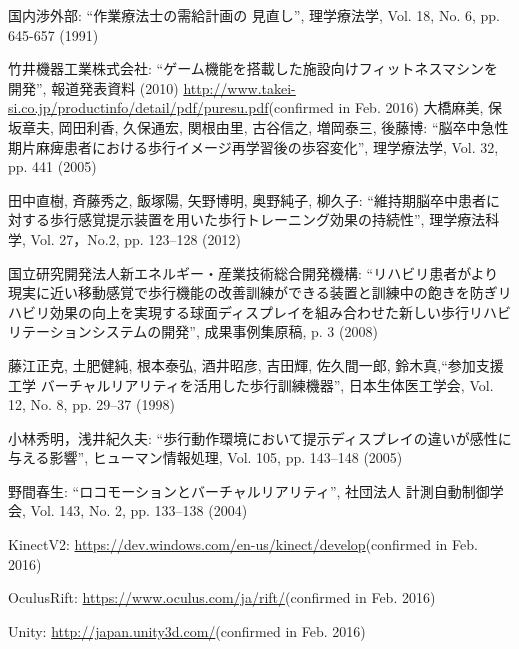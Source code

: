 \thispagestyle{myheadings}
\markright{}
\def\bibname{参考文献}
\begin{thebibliography}{20}


国内渉外部: ``作業療法士の需給計画の 見直し'', 理学療法学, Vol. 18, No. 6, pp. 645-657 (1991)

竹井機器工業株式会社: ``ゲーム機能を搭載した施設向けフィットネスマシンを開発'', 報道発表資料 (2010)
\url{http://www.takei-si.co.jp/productinfo/detail/pdf/puresu.pdf}(confirmed in Feb. 2016)
大橋麻美, 保坂章夫, 岡田利香, 久保通宏, 関根由里, 古谷信之, 増岡泰三, 後藤博: ``脳卒中急性期片麻痺患者における歩行イメージ再学習後の歩容変化'', 理学療法学, Vol. 32,  pp. 441 (2005)

田中直樹, 斉藤秀之, 飯塚陽, 矢野博明, 奥野純子, 柳久子: ``維持期脳卒中患者に対する歩行感覚提示装置を用いた歩行トレーニング効果の持続性'', 理学療法科学, Vol. 27，No.2, pp. 123--128 (2012)

国立研究開発法人新エネルギー・産業技術総合開発機構: ``リハビリ患者がより現実に近い移動感覚で歩行機能の改善訓練ができる装置と訓練中の飽きを防ぎリハビリ効果の向上を実現する球面ディスプレイを組み合わせた新しい歩行リハビリテーションシステムの開発'', 成果事例集原稿, p. 3 (2008)

藤江正克, 土肥健純, 根本泰弘, 酒井昭彦, 吉田輝, 佐久間一郎, 鈴木真,``参加支援工学 バーチャルリアリティを活用した歩行訓練機器'', 日本生体医工学会, Vol. 12, No. 8, pp. 29--37 (1998) 

小林秀明，浅井紀久夫: ``歩行動作環境において提示ディスプレイの違いが感性に与える影響'', ヒューマン情報処理, Vol. 105, pp. 143--148 (2005)

野間春生: ``ロコモーションとバーチャルリアリティ'', 社団法人 計測自動制御学会, Vol. 143, No. 2, pp. 133--138 (2004)

KinectV2: \url{https://dev.windows.com/en-us/kinect/develop}(confirmed in Feb. 2016)

OculusRift: \url{https://www.oculus.com/ja/rift/}(confirmed in Feb. 2016)

Unity: \url{http://japan.unity3d.com/}(confirmed in Feb. 2016)


\end{thebibliography}

